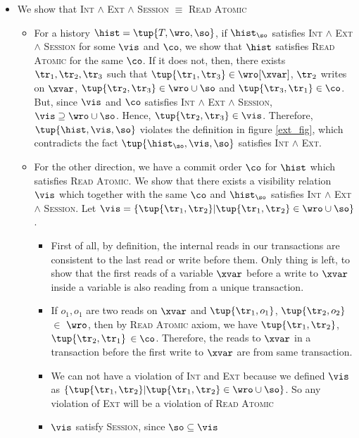\begin{itemize}
 \item 
       We show that \textsc{Int} $\land$ \textsc{Ext} $\land$ \textsc{Session} $\equiv$ \textsc{Read Atomic}
       \begin{itemize}

        \item For a history $\hist = \tup{T, \wro, \so}$, if $\hist_{\so}$ satisfies \textsc{Int} $\land$ \textsc{Ext} $\land$ \textsc{Session} for some $\vis$ and $\co$, we show that $\hist$ satisfies \textsc{Read Atomic} for the same $\co$. If it does not, then, there exists $\tr_1, \tr_2, \tr_3$ such that $\tup{\tr_1, \tr_3} \in \wro[\xvar]$, $\tr_2$ writes on $\xvar$, $\tup{\tr_2,\tr_3} \in \wro \cup \so$ and $\tup{\tr_3, \tr_1} \in \co$. But, since $\vis$ and $\co$ satisfies \textsc{Int} $\land$ \textsc{Ext} $\land$ \textsc{Session}, $\vis \supseteq \wro \cup \so$. Hence, $\tup{\tr_2,\tr_3} \in \vis$. Therefore, $\tup{\hist, \vis, \so}$ violates the definition in figure \ref{ext_fig}, which contradicts the fact $\tup{\hist_{\so}, \vis, \so}$ satisfies \textsc{Int} $\land$ \textsc{Ext}.
              
        \item For the other direction, we have a commit order $\co$ for $\hist$ which satisfies \textsc{Read Atomic}. We show that there exists a visibility relation $\vis$ which together with the same $\co$ and $\hist_{\so}$ satisfies \textsc{Int} $\land$ \textsc{Ext} $\land$ \textsc{Session}. Let $\vis = \{ \tup{\tr_1, \tr_2} | \tup{\tr_1, \tr_2} \in \wro \cup \so \}$.
              
              \begin{itemize}
               \item First of all, by definition, the internal reads in our transactions are consistent to the last read or write before them. Only thing is left, to show that the first reads of a variable $\xvar$ before a write to $\xvar$ inside a variable is also reading from a unique transaction.
               \item If $o_1, o_1$ are two reads on $\xvar$ and $\tup{\tr_1, o_1}$, $\tup{\tr_2, o_2}$ $\in$ $\wro$, then by \textsc{Read Atomic} axiom, we have $\tup{\tr_1, \tr_2}$, $\tup{\tr_2, \tr_1}$ $\in \co$. Therefore, the reads to $\xvar$ in a transaction before the first write to $\xvar$ are from same transaction.
               \item We can not have a violation of \textsc{Int} and \textsc{Ext} because we defined $\vis$ as $\{ \tup{\tr_1, \tr_2} | \tup{\tr_1, \tr_2} \in \wro \cup \so \}$. So any violation of \textsc{Ext} will be a violation of \textsc{Read Atomic}
               \item $\vis$ satisfy \textsc{Session}, since $\so \subseteq \vis$
              \end{itemize}
              

\end{itemize}
\end{itemize}
